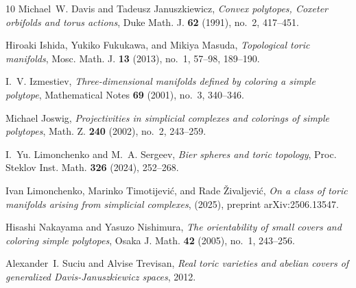\documentclass{amsart}
\theoremstyle{plain}
\numberwithin{equation}{section}
\theoremstyle{definition}
\theoremstyle{remark}
\begin{document}
\begin{thebibliography}{10}
Michael~W. Davis and Tadeusz Januszkiewicz, \emph{Convex polytopes, {C}oxeter
  orbifolds and torus actions}, Duke Math. J. \textbf{62} (1991), no.~2,
  417--451. 

Hiroaki Ishida, Yukiko Fukukawa, and Mikiya Masuda, \emph{Topological toric
  manifolds}, Mosc. Math. J. \textbf{13} (2013), no.~1, 57--98, 189--190.

I.~V. Izmestiev, \emph{Three-dimensional manifolds defined by coloring a simple
  polytope}, Mathematical Notes \textbf{69} (2001), no.~3, 340--346.

Michael Joswig, \emph{Projectivities in simplicial complexes and colorings of
  simple polytopes}, Math. Z. \textbf{240} (2002), no.~2, 243--259.

I.~Yu. Limonchenko and M.~A. Sergeev, \emph{Bier spheres and toric topology},
  Proc. Steklov Inst. Math. \textbf{326} (2024), 252--268. 

Ivan Limonchenko, Marinko Timotijevi{\'c}, and Rade {\v{Z}}ivaljevi{\'c},
  \emph{On a class of toric manifolds arising from simplicial complexes},
  (2025), preprint arXiv:2506.13547.

Hisashi Nakayama and Yasuzo Nishimura, \emph{The orientability of small covers
  and coloring simple polytopes}, Osaka J. Math. \textbf{42} (2005), no.~1,
  243--256. 

Alexander~I. Suciu and Alvise Trevisan, \emph{Real toric varieties and abelian
  covers of generalized {D}avis-{J}anuszkiewicz spaces}, 2012.

\end{thebibliography}
\end{document}
